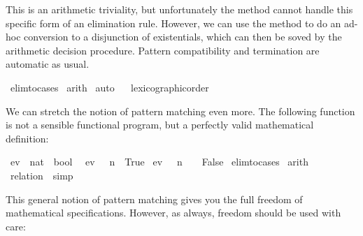 \begin{isabellebody}
\begin{isamarkuptxt}
  This is an arithmetic triviality, but unfortunately the
   method cannot handle this specific form of an
  elimination rule. However, we can use the method  to do an ad-hoc conversion to a disjunction of
  existentials, which can then be soved by the arithmetic decision procedure.
  Pattern compatibility and termination are automatic as usual.%
\end{isamarkuptxt}%
\isamarkuptrue%
%
\endisatagproof
{\isafoldproof}%
%
\isadelimproof
%
\endisadelimproof
%
\isadelimML
%
\endisadelimML
%
\isatagML
%
\endisatagML
{\isafoldML}%
%
\isadelimML
%
\endisadelimML
%
\isadelimproof
%
\endisadelimproof
%
\isatagproof
{}\isamarkupfalse%
\ elim{\isacharunderscore}to{\isacharunderscore}cases\isanewline
{}\isamarkupfalse%
\ arith\isanewline
{}\isamarkupfalse%
\ auto\isanewline
{}\isamarkupfalse%
%
\endisatagproof
{\isafoldproof}%
%
\isadelimproof
%
\endisadelimproof
\isanewline
{}\isamarkupfalse%
%
\isadelimproof
\ %
\endisadelimproof
%
\isatagproof
{}\isamarkupfalse%
\ lexicographic{\isacharunderscore}order%
\endisatagproof
{\isafoldproof}%
%
\isadelimproof
%
\endisadelimproof
%
\begin{isamarkuptext}%
We can stretch the notion of pattern matching even more. The
  following function is not a sensible functional program, but a
  perfectly valid mathematical definition:%
\end{isamarkuptext}%
\isamarkuptrue%
\isamarkupfalse%
\ ev\ {\isacharcolon}{\isacharcolon}\ {\isachardoublequoteopen}nat\ {\isasymRightarrow}\ bool{\isachardoublequoteclose}\isanewline
{}\isanewline
\ \ {\isachardoublequoteopen}ev\ {\isacharparenleft}{}\ {\isacharasterisk}\ n{\isacharparenright}\ {\isacharequal}\ True{\isachardoublequoteclose}\isanewline
{\isacharbar}\ {\isachardoublequoteopen}ev\ {\isacharparenleft}{}\ {\isacharasterisk}\ n\ {\isacharplus}\ {}{\isacharparenright}\ {\isacharequal}\ False{\isachardoublequoteclose}\isanewline
%
\isadelimproof
%
\endisadelimproof
%
\isatagproof
{}\isamarkupfalse%
\ elim{\isacharunderscore}to{\isacharunderscore}cases\isanewline
{}\isamarkupfalse%
\ arith{\isacharplus}%
\endisatagproof
{\isafoldproof}%
%
\isadelimproof
\isanewline
%
\endisadelimproof
{}\isamarkupfalse%
%
\isadelimproof
\ %
\endisadelimproof
%
\isatagproof
{}\isamarkupfalse%
\ {\isacharparenleft}relation\ {\isachardoublequoteopen}{\isacharbraceleft}{\isacharbraceright}{\isachardoublequoteclose}{\isacharparenright}\ simp%
\endisatagproof
{\isafoldproof}%
%
\isadelimproof
%
\endisadelimproof
%
\begin{isamarkuptext}%
This general notion of pattern matching gives you the full freedom
  of mathematical specifications. However, as always, freedom should
  be used with care:


\end{isamarkuptext}
\end{isabellebody}
